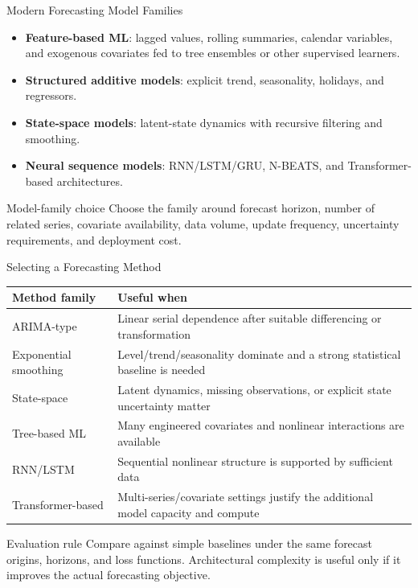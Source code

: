 
\begin{frame}{Modern Forecasting Model Families}
\begin{itemize}
  \item \textbf{Feature-based ML}: lagged values, rolling summaries, calendar variables, and exogenous covariates fed to tree ensembles or other supervised learners.
  \item \textbf{Structured additive models}: explicit trend, seasonality, holidays, and regressors.
  \item \textbf{State-space models}: latent-state dynamics with recursive filtering and smoothing.
  \item \textbf{Neural sequence models}: RNN/LSTM/GRU, N-BEATS, and Transformer-based architectures.
\end{itemize}

\begin{alertblock}{Model-family choice}
Choose the family around forecast horizon, number of related series, covariate availability, data volume, update frequency, uncertainty requirements, and deployment cost.
\end{alertblock}
\end{frame}

\begin{frame}{Selecting a Forecasting Method}
\begin{table}
\small
\begin{tabular}{p{}p{}}
\toprule
\textbf{Method family} & \textbf{Useful when} \\
\midrule
ARIMA-type & Linear serial dependence after suitable differencing or transformation \\
Exponential smoothing & Level/trend/seasonality dominate and a strong statistical baseline is needed \\
State-space & Latent dynamics, missing observations, or explicit state uncertainty matter \\
Tree-based ML & Many engineered covariates and nonlinear interactions are available \\
RNN/LSTM & Sequential nonlinear structure is supported by sufficient data \\
Transformer-based & Multi-series/covariate settings justify the additional model capacity and compute \\
\bottomrule
\end{tabular}
\end{table}

\begin{block}{Evaluation rule}
Compare against simple baselines under the same forecast origins, horizons, and loss functions. Architectural complexity is useful only if it improves the actual forecasting objective.
\end{block}
\end{frame}

